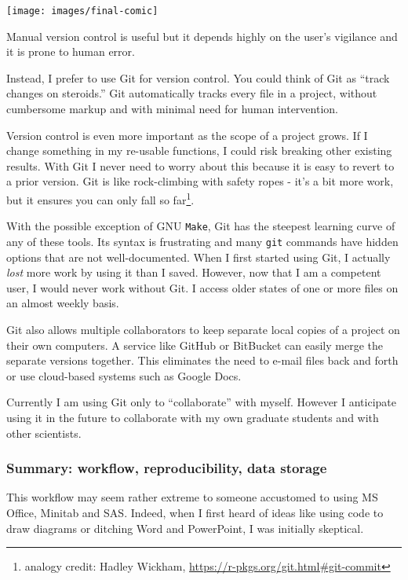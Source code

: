 \documentclass[
  letterpaper,
  openany]{book}
\begin{document}
\begin{center}\texttt{[image: images/final-comic]} \end{center}

Manual version control is useful but it depends highly on the user's vigilance and it is prone to human error.

Instead, I prefer to use Git for version control.
You could think of Git as ``track changes on steroids.''
Git automatically tracks every file in a project, without cumbersome markup and with minimal need for human intervention.

Version control is even more important as the scope of a project grows.
If I change something in my re-usable functions, I could risk breaking other existing results.
With Git I never need to worry about this because it is easy to revert to a prior version.
Git is like rock-climbing with safety ropes - it's a bit more work, but it ensures you can only fall so far\footnote{analogy credit: Hadley Wickham, \url{https://r-pkgs.org/git.html\#git-commit}}.

With the possible exception of GNU \texttt{Make}, Git has the steepest learning curve of any of these tools.
Its syntax is frustrating and many \texttt{git} commands have hidden options that are not well-documented.
When I first started using Git, I actually \emph{lost} more work by using it than I saved.
However, now that I am a competent user, I would never work without Git.
I access older states of one or more files on an almost weekly basis.

Git also allows multiple collaborators to keep separate local copies of a project on their own computers.
A service like GitHub or BitBucket can easily merge the separate versions together.
This eliminates the need to e-mail files back and forth or use cloud-based systems such as Google Docs.

Currently I am using Git only to ``collaborate'' with myself.
However I anticipate using it in the future to collaborate with my own graduate students and with other scientists.

\hypertarget{summary-workflow}{%
\subsubsection*{Summary: workflow, reproducibility, data storage}\label{summary-workflow}}

This workflow may seem rather extreme to someone accustomed to using MS Office, Minitab and SAS.
Indeed, when I first heard of ideas like using code to draw diagrams or ditching Word and PowerPoint, I was initially skeptical.
\end{document}
